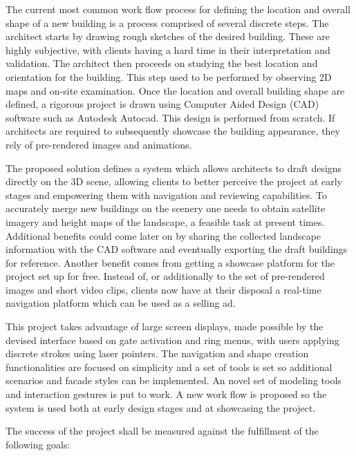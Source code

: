 
The current most common work flow process for defining the location and overall shape
of a new building is a process comprised of several discrete steps.
The architect starts by drawing rough sketches of the desired building.
These are highly subjective, with clients having a hard time in their interpretation and validation.
The architect then proceeds on studying the best location and orientation for the building.
This step used to be performed by observing 2D maps and on-site examination.
Once the location and overall building shape are defined, a rigorous project is drawn using
Computer Aided Design (CAD) software such as Autodesk Autocad\cite{SITE-AUTOCAD}.
This design is performed from scratch.
If architects are required to subsequently showcase the building appearance,
they rely of pre-rendered images and animations.



The proposed solution defines a system which allows architects to draft designs
directly on the 3D scene, allowing clients to better perceive the project at early stages
and empowering them with navigation and reviewing capabilities.
To accurately merge new buildings on the scenery one needs to obtain
satellite imagery and height maps of the landscape, a feasible task at present times.
Additional benefits could come later on by sharing the collected landscape information
with the CAD software and eventually exporting the draft buildings for reference.
Another benefit comes from getting a showcase platform for the project set up for free.
Instead of, or additionally to the set of pre-rendered images and short video clips,
clients now have at their disposal a real-time navigation platform which can be used
as a selling ad.



This project takes advantage of large screen displays,
made possible by the devised interface based on gate activation and ring menus,
with users applying discrete strokes using laser pointers.
The navigation and shape creation functionalities are focused on simplicity and a set
of tools is set so additional scenarios and facade styles can be implemented.
An novel set of modeling tools and interaction gestures is put to work.
A new work flow is proposed so the system is used both at early design stages and
at showcasing the project.

The success of the project shall be measured against the fulfillment of the following goals:


